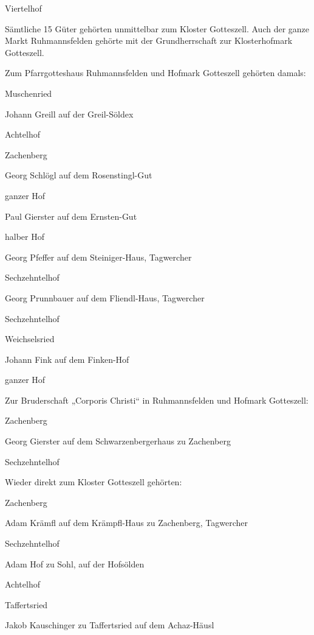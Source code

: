 Viertelhof



Sämtliche 15 Güter gehörten unmittelbar zum Kloster Gotteszell. Auch der ganze
Markt Ruhmannsfelden gehörte mit der Grundherrschaft zur Klosterhofmark
Gotteszell.



Zum Pfarrgotteshaus Ruhmannsfelden und Hofmark Gotteszell gehörten damals:



Muschenried

Johann Greill auf der Greil-Söldex

Achtelhof

Zachenberg

Georg Schlögl auf dem Rosenstingl-Gut

ganzer Hof



Paul Gierster auf dem Ernsten-Gut

halber Hof



Georg Pfeffer auf dem Steiniger-Haus, Tagwercher

Sechzehntelhof



Georg Prunnbauer auf dem Fliendl-Haus, Tagwercher

Sechzehntelhof

Weichselsried

Johann Fink auf dem Finken-Hof

ganzer Hof



Zur Bruderschaft „Corporis Christi“ in Ruhmannsfelden und Hofmark Gotteszell:



Zachenberg

Georg Gierster auf dem Schwarzenbergerhaus zu Zachenberg

Sechzehntelhof



Wieder direkt zum Kloster Gotteszell gehörten:



Zachenberg

Adam Krämfl auf dem Krämpfl-Haus zu Zachenberg, Tagwercher

Sechzehntelhof



Adam Hof zu Sohl, auf der Hofsölden

Achtelhof

Taffertsried

Jakob Kauschinger zu Taffertsried auf dem Achaz-Häusl

